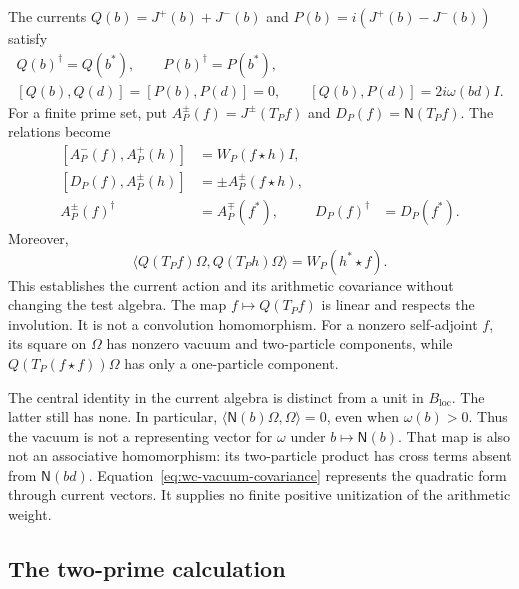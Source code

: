 \documentclass[11pt]{article}
\theoremstyle{definition}
\theoremstyle{remark}
\numberwithin{equation}{section}
\begin{document}
The currents $Q(b)=J^+(b)+J^-(b)$ and
$P(b)=i(J^+(b)-J^-(b))$ satisfy
\[
 \begin{gathered}
 Q(b)^\dagger=Q(b^*),\qquad P(b)^\dagger=P(b^*),\\
 [Q(b),Q(d)]=[P(b),P(d)]=0,\qquad
 [Q(b),P(d)]=2i\omega(bd)I.
 \end{gathered}
\]
For a finite prime set, put
$A_P^\pm(f)=J^\pm(T_Pf)$ and $D_P(f)=\mathsf N(T_Pf)$.
The relations become
\begin{equation}
 \begin{aligned}
 [A_P^-(f),A_P^+(h)]&=W_P(f\star h)I,\\
 [D_P(f),A_P^\pm(h)]&=\pm A_P^\pm(f\star h),\\
 A_P^\pm(f)^\dagger&=A_P^\mp(f^*),&
 D_P(f)^\dagger&=D_P(f^*).
 \end{aligned}
 \label{eq:wc-native-current-relations}
\end{equation}
Moreover,
\begin{equation}
 \langle Q(T_Pf)\Omega,Q(T_Ph)\Omega\rangle
 =W_P(h^*\star f).
 \label{eq:wc-vacuum-covariance}
\end{equation}
This establishes the current action and its arithmetic covariance
without changing the test algebra.
The map $f\mapsto Q(T_Pf)$ is linear and respects the involution.
It is not a convolution homomorphism.
For a nonzero self-adjoint $f$, its square on $\Omega$ has nonzero
vacuum and two-particle components, while $Q(T_P(f\star f))\Omega$
has only a one-particle component.

The central identity in the current algebra is distinct from a unit in
$B_{\mathrm{loc}}$.  The latter still has none.
In particular, $\langle\mathsf N(b)\Omega,\Omega\rangle=0$, even when
$\omega(b)>0$.  Thus the vacuum is not a representing vector for
$\omega$ under $b\mapsto\mathsf N(b)$.
That map is also not an associative homomorphism: its two-particle
product has cross terms absent from $\mathsf N(bd)$.
Equation~\eqref{eq:wc-vacuum-covariance} represents the quadratic form
through current vectors.  It supplies no finite positive unitization
of the arithmetic weight.

\subsection{The two-prime calculation}
\end{document}
